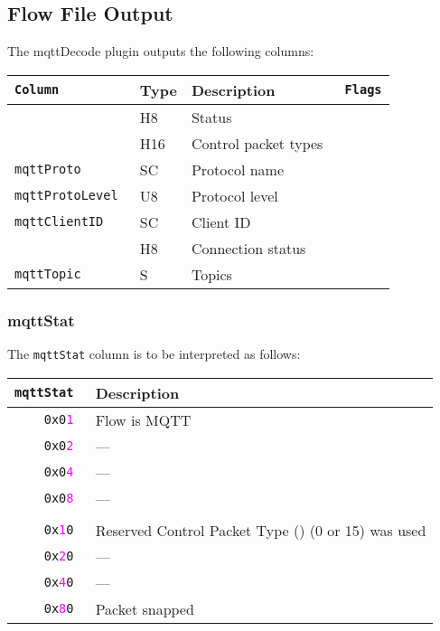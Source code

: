 \documentclass[documentation]{subfiles}
\begin{document}
\subsection{Flow File Output}
The mqttDecode plugin outputs the following columns:
\begin{longtable}{>{\tt}lll>{\tt\small}l}
    \toprule
    {\bf Column}           & {\bf Type} & {\bf Description}    & {\bf Flags}\\
    \midrule\endhead%
    \nameref{mqttStat}     & H8         & Status               & \\
    \nameref{mqttCPT}      & H16        & Control packet types & \\
    mqttProto              & SC         & Protocol name        & \\
    mqttProtoLevel         & U8         & Protocol level       & \\
    mqttClientID           & SC         & Client ID            & \\
    \nameref{mqttConAck}   & H8         & Connection status    & \\
    mqttTopic              & S          & Topics               & \\
    \bottomrule
\end{longtable}

\subsubsection{mqttStat}\label{mqttStat}
The {\tt mqttStat} column is to be interpreted as follows:
\begin{longtable}{>{\tt}rl}
    \toprule
    {\bf mqttStat}            & {\bf Description}\\
    \midrule\endhead%
    0x0\textcolor{magenta}{1} & Flow is MQTT\\
    0x0\textcolor{magenta}{2} & ---\\
    0x0\textcolor{magenta}{4} & ---\\
    0x0\textcolor{magenta}{8} & ---\\
    \\
    0x\textcolor{magenta}{1}0 & Reserved Control Packet Type ({\tt\nameref{mqttCPT}}) (0 or 15) was used\\
    0x\textcolor{magenta}{2}0 & ---\\
    0x\textcolor{magenta}{4}0 & ---\\
    0x\textcolor{magenta}{8}0 & Packet snapped\\
    \bottomrule
\end{longtable}
\end{document}

